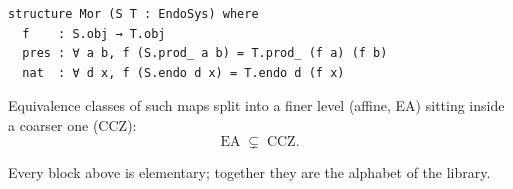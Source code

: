 \documentclass[11pt]{article}
\begin{document}
\begin{lstlisting}
structure Mor (S T : EndoSys) where
  f    : S.obj → T.obj
  pres : ∀ a b, f (S.prod_ a b) = T.prod_ (f a) (f b)
  nat  : ∀ d x, f (S.endo d x) = T.endo d (f x)
\end{lstlisting}

Equivalence classes of such maps split into a finer level (affine, EA) sitting
inside a coarser one (CCZ):
\[
  \mathrm{EA} \;\subsetneq\; \mathrm{CCZ}.
\]

\bigskip
\begin{center}\small
Every block above is elementary; together they are the alphabet of the library.
\end{center}
\end{document}
